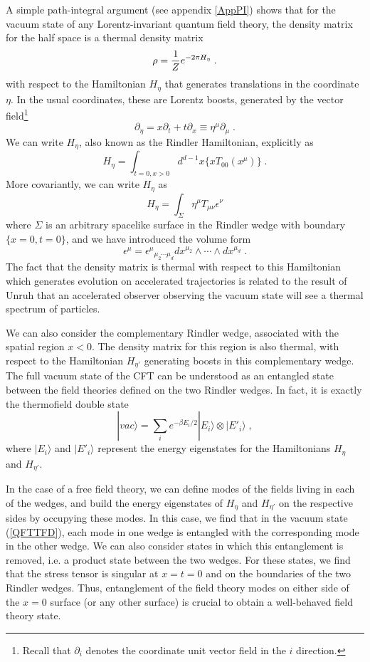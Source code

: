 \documentclass[12pt,epsf]{article}
\newcommand{\be}{\begin{equation}}
\newcommand{\ee}{\end{equation}}
\begin{document}
A simple path-integral argument (see appendix \ref{AppPI}) shows that for the vacuum state of any Lorentz-invariant quantum field theory, the density matrix for the half space is a thermal density matrix
\be
\label{Rindlerrho}
\rho = {1 \over Z} e^{- 2 \pi H_\eta} \; .
\ee
with respect to the Hamiltonian $H_\eta$ that generates translations in the coordinate $\eta$. In the usual coordinates, these are Lorentz boosts, generated by the vector field\footnote{Recall that $\partial_i$ denotes the coordinate unit vector field in the $i$ direction.}
\be
\partial_\eta = x \partial_t + t \partial_{x} \equiv \eta^\mu \partial_\mu  \; .
\ee
We can write $H_\eta$, also known as the Rindler Hamiltonian, explicitly as
\be
\label{Rindham}
H_\eta = \int_{t=0, x > 0} d^{d-1} x \{ x T_{00}(x^\mu) \} \; .
\ee
More covariantly, we can write $H_\eta$ as
\be
H_\eta = \int_\Sigma \eta^\mu T_{\mu \nu} \epsilon^\nu
\ee
where $\Sigma$ is an arbitrary spacelike surface in the Rindler wedge with boundary $\{x=0,t=0\}$, and we have introduced the volume form
\be
\label{defepsilon}
\epsilon^\mu = \epsilon^\mu {}_{\mu_2 \cdots \mu_{d}} dx^{\mu_2} \wedge \cdots \wedge dx^{\mu_d} \; .
\ee
The fact that the density matrix is thermal with respect to this Hamiltonian which generates evolution on accelerated trajectories is related to the result of Unruh that an accelerated observer observing the vacuum state will see a thermal spectrum of particles.

We can also consider the complementary Rindler wedge, associated with the spatial region $x < 0$. The density matrix for this region is also thermal, with respect to the Hamiltonian $H_{\eta'}$ generating boosts in this complementary wedge. The full vacuum state of the CFT can be understood as an entangled state between the field theories defined on the two Rindler wedges. In fact, it is exactly the thermofield double state
\be
\label{QFTTFD}
|vac \rangle = \sum_i e^{- \beta E_i / 2} | E_i \rangle \otimes |E'_i \rangle \; ,
\ee
where $|E_i \rangle$ and $|E'_i \rangle$ represent the energy eigenstates for the Hamiltonians $H_\eta$ and $H_{\eta'}$.

In the case of a free field theory, we can define modes of the fields living in each of the wedges, and build the energy eigenstates of $H_\eta$ and $H_{\eta'}$ on the respective sides by occupying these modes. In this case, we find that in the vacuum state (\ref{QFTTFD}), each mode in one wedge is entangled with the corresponding mode in the other wedge. We can also consider states in which this entanglement is removed, i.e. a product state between the two wedges. For these states, we find that the stress tensor is singular at $x=t=0$ and on the boundaries of the two Rindler wedges. Thus, entanglement of the field theory modes on either side of the $x=0$ surface (or any other surface) is crucial to obtain a well-behaved field theory state.
\end{document}
